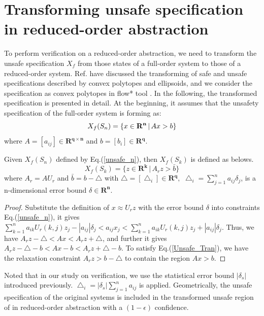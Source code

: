 \documentclass[runningheads,a4paper]{llncs}
\theoremstyle{definition}
\theoremstyle{plain}
\begin{document}
\section{Transforming unsafe specification in reduced-order abstraction}  \label{specification}
To perform verification on a reduced-order abstraction, we need to transform the unsafe specification $X_f$ from those states of a full-order system to those of a reduced-order system. Ref.\cite{Tran2017} have discussed the transforming of safe and unsafe specifications described by convex polytopes and ellipsoids, and we consider the specification as convex polytopes in flow* tool \cite{6987596}. In the following, the transformed specification is presented in detail. At the beginning, it assumes that the unsafety specification of the full-order system is forming as:    
\begin{equation}
X_f(S_n)=\{x \in \mathbf{ R^n} \, |\, Ax> b\}\\\label{unsafe_n} 
\end{equation}
where $A=\left[ a_{ij}\right] \in \mathbf{ R^{q\times n}}$ and $b=\left[ b_{i}\right] \in \mathbf{ R^q}$. \\
\begin{lemma}
Given $X_f(S_n)$ defined by Eq.(\ref{unsafe_n}),  then $X_f(S_k)$ is defined as belows.\\
\begin{equation}
X_f(S_k)=\{z \in \mathbf{ R^k} \, |\, A_r z > \bar{b}\}
\end{equation}
where $A_r=A U_r$ and $\bar{b}=b-\bigtriangleup$ with $\bigtriangleup=[\bigtriangleup_i] \in \mathbf{ R^q},$ $\bigtriangleup_i=\sum_{j=1}^n  a_{ij} \delta_j$,  is a n-dimensional error bound $\delta \in \mathbf{ R^n}$.
\end{lemma}
\begin{proof}
Substitute the definition of $x \approx U_r z$ with the error bound $\delta$ into constraints Eq.(\ref{unsafe_n}), it gives $\sum_{k=1}^{n} a_{ik}U_r(k,j) z_j - |a_{ij}|\delta_j < a_{ij} x_j<\sum_{k=1}^{n} a_{ik}U_r(k,j) z_j + |a_{ij}|\delta_j $. Thus, we have $ A_r z- \bigtriangleup<A x<A_r z+ \bigtriangleup$, and further it gives $ A_r z- \bigtriangleup-b<A x-b<A_r z+ \bigtriangleup-b$. To satisfy Eq.(\ref{Unsafe_Tran}), we have the relaxation constraint $A_r z>b-\bigtriangleup$ to contain the region $Ax>b$.
\end{proof}
Noted that in our study on verification, we use the statistical error bound $|\delta_s|$ introduced previously. $\bigtriangleup_i=|\delta_s| \sum_{j=1}^n  a_{ij}$ is applied. 
Geometrically, the unsafe specification of the original systems is included in the transformed unsafe region of in reduced-order abstraction with a $(1-\epsilon)$ confidence.
\end{document}
